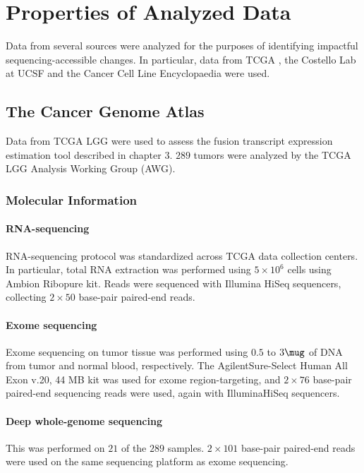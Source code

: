 \chapter{Properties of Analyzed Data}

Data from several sources were analyzed for the purposes of
identifying impactful sequencing-accessible changes. In particular,
data from TCGA \cite{_comprehensive_2015}, the Costello Lab at
UCSF\cite{johnson_mutational_2014} and the Cancer Cell Line
Encyclopaedia\cite{barretina_cancer_2012} were used. 

\section{The Cancer Genome Atlas}

Data from TCGA LGG were used to assess the fusion transcript
expression estimation tool described in chapter 3. $289$ tumors were
analyzed by the TCGA LGG Analysis Working Group (AWG). 

\subsection{Molecular Information}

\subsubsection{RNA-sequencing}
RNA-sequencing protocol was standardized across TCGA data collection
centers. In particular, total RNA extraction was performed using $5 \times 10^6$
cells using Ambion\textsuperscript{\textregistered}
Ribopure\textsuperscript{\texttrademark} kit. Reads were sequenced
with Illumina\textsuperscript{\textregistered}
HiSeq\textsuperscript{\texttrademark} sequencers, collecting
$2 \times 50$ base-pair paired-end reads. 

\subsubsection{Exome sequencing}
Exome sequencing on tumor tissue was performed using $0.5$ to $3
\mug$ of DNA from tumor and normal blood, respectively. The
Agilent\reg  Sure-Select Human All Exon \tm v.20, 44 MB kit was used
for exome region-targeting, and $2 \times 76$ base-pair paired-end
sequencing reads were used, again with Illumina\reg HiSeq\tm
sequencers.


\subsubsection{Deep whole-genome sequencing}
This was performed on $21$ of the $289$ samples. $2 \times 101$ base-pair paired-end reads were used on the same
sequencing platform as exome sequencing.

